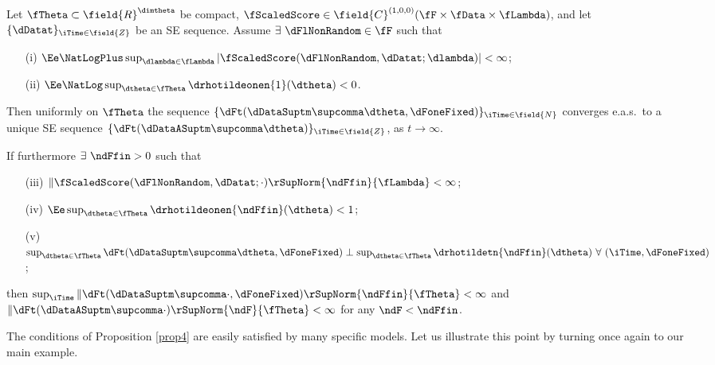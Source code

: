 \begin{prop} \label{prop4} 
Let $\fTheta \subset \field{R}^{\dimtheta}$ be compact,
$\fScaledScore \in \field{C}^{(1,0,0)}(\fF \times \fData \times \fLambda )$,
and let $\{\dDatat\}_{\iTime \in \field{Z}}$ be an  SE sequence.
Assume $\exists \ \dFlNonRandom \in \fF$ 
such that
\begin{enumerate}
    \item[(i)] $\Ee \NatLogPlus \sup_{\dlambda \in \fLambda} 
    |\fScaledScore(\dFlNonRandom,\dDatat; \dlambda)| < \infty$;
    \item[(ii)] $\Ee \NatLog \sup_{\dtheta \in \fTheta}
        \drhotildeonen{1}(\dtheta)  < 0$.
\end{enumerate}
Then uniformly on $\fTheta$ the sequence 
$\{\dFt(\dDataSuptm\supcomma\dtheta,\dFoneFixed)\}_{\iTime \in \field{N}}$ 
converges e.a.s.~to a unique SE sequence
$\{\dFt(\dDataASuptm\supcomma\dtheta)\}_{\iTime \in \field{Z}}$, 
 as $t \to \infty$.

If furthermore  $\exists \ \ndFfin > 0$ such that 
\begin{enumerate}
    \item[(iii)] $ \|\fScaledScore(\dFlNonRandom,\dDatat; \cdot)\rSupNorm{\ndFfin}{\fLambda}
        < \infty$;
    \item[(iv)] $\Ee \sup_{\dtheta \in \fTheta} \drhotildeonen{\ndFfin}(\dtheta) < 1$;
    \item[(v)] $\sup_{\dtheta\in\fTheta} \dFt(\dDataSuptm\supcomma\dtheta,\dFoneFixed) \perp \sup_{\dtheta\in\fTheta} \drhotildetn{\ndFfin}(\dtheta)
        \ \forall \ (\iTime,\dFoneFixed)$;
\end{enumerate} 
then
$\sup_{\iTime} \|  \dFt(\dDataSuptm\supcomma\cdot,\dFoneFixed) \rSupNorm{\ndFfin}{\fTheta} < \infty$
and  
$\|\dFt(\dDataASuptm\supcomma\cdot)\rSupNorm{\ndF}{\fTheta} < \infty$ for any $\ndF<\ndFfin$.
\end{prop}

The conditions of Proposition \ref{prop4} are easily satisfied by many specific models. Let us illustrate this point by  turning once again to our main example.

